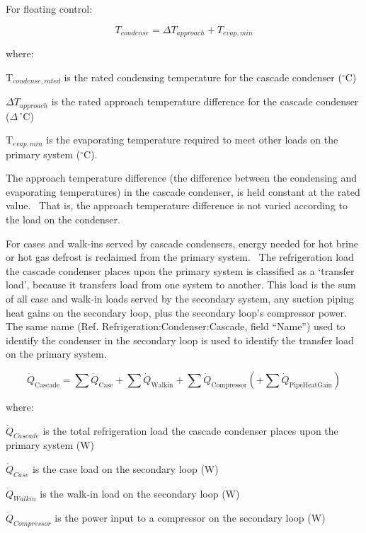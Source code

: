 For floating control:

\begin{equation}
T_{condense} = \Delta{T_{approach}} + T_{evap,min}
\end{equation}

where:

T\(_{condense,rated}\) is the rated condensing temperature for the cascade condenser (\(^{\circ}\)C)

\(\Delta T_{approach}\) is the rated approach temperature difference for the cascade condenser (\(\Delta\,^{\circ}\mathrm{C}\))

T\(_{evap,min}\) is the evaporating temperature required to meet other loads on the primary system (\(^{\circ}\)C).

The approach temperature difference (the difference between the condensing and evaporating temperatures) in the cascade condenser, is held constant at the rated value.~ That is, the approach temperature difference is not varied according to the load on the condenser.

For cases and walk-ins served by cascade condensers, energy needed for hot brine or hot gas defrost is reclaimed from the primary system.~ The refrigeration load the cascade condenser places upon the primary system is classified as a `transfer load', because it transfers load from one system to another. This load is the sum of all case and walk-in loads served by the secondary system, any suction piping heat gains on the secondary loop, plus the secondary loop's compressor power. The same name (Ref. Refrigeration:Condenser:Cascade, field ``Name'') used to identify the condenser in the secondary loop is used to identify the transfer load on the primary system.

\begin{equation}
{\dot Q_{{\mathrm{Cascade}}}} = {\sum {\dot Q}_{{\mathrm{Case}}}} + \sum {{{\dot Q}_{{\mathrm{Walkin}}}} + } \sum {{{\dot Q}_{{\mathrm{Compressor}}}}} \left( { + \sum {{{\dot Q}_{{\mathrm{PipeHeatGain}}}}} } \right)
\end{equation}

where:

\({\dot Q_{Cascade}}\) is the total refrigeration load the cascade condenser places upon the primary system (W)

\({\dot Q_{Case}}\) is the case load on the secondary loop (W)

\({\dot Q_{Walkin}}\) is the walk-in load on the secondary loop (W)

\({\dot Q_{Compressor}}\) is the power input to a compressor on the secondary loop (W)

